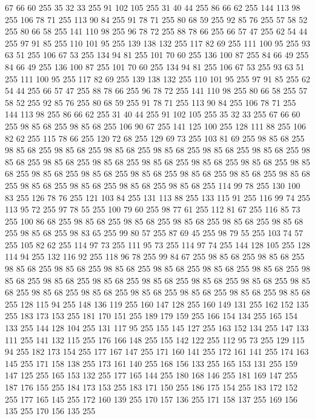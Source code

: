 67 66 60 255 35 32 33 255 91 102 105 255 31 40 44 255 86 66 62 255 144 113 98 255 106 78 71 255 113 90 84 255 91 78 71 255 80 68 59 255 92 85 76 255 57 58 52 255 80 66 58 255 141 110 98 255 96 78 72 255 88 78 66 255 66 57 47 255 62 54 44 255 97 91 85 255 110 101 95 255 139 138 132 255 117 82 69 255 111 100 95 255 93 63 51 255 106 67 53 255 134 94 81 255 101 70 60 255 136 100 87 255 84 66 49 255 84 66 49 255 136 100 87 255 101 70 60 255 134 94 81 255 106 67 53 255 93 63 51 255 111 100 95 255 117 82 69 255 139 138 132 255 110 101 95 255 97 91 85 255 62 54 44 255 66 57 47 255 88 78 66 255 96 78 72 255 141 110 98 255 80 66 58 255 57 58 52 255 92 85 76 255 80 68 59 255 91 78 71 255 113 90 84 255 106 78 71 255 144 113 98 255 86 66 62 255 31 40 44 255 91 102 105 255 35 32 33 255 67 66 60 255 98 85 68 255 98 85 68 255 106 90 67 255 141 125 100 255 128 111 88 255 106 82 62 255
115 78 66 255 120 72 68 255 129 69 73 255 103 81 69 255 98 85 68 255 98 85 68 255 98 85 68 255 98 85 68 255 98 85 68 255 98 85 68 255 98 85 68 255 98 85 68 255 98 85 68 255 98 85 68 255 98 85 68 255 98 85 68 255 98 85 68 255 98 85 68 255 98 85 68 255 98 85 68 255 98 85 68 255 98 85 68 255 98 85 68 255 98 85 68 255 98 85 68 255 98 85 68 255 98 85 68 255 98 85 68 255 114 99 78 255 130 100 83 255 126 78 76 255 121 103 84 255 131 113 88 255 133 115 91 255 116 99 74 255 113 95 72 255 97 78 55 255 100 79 60 255 98 77 61 255 112 81 67 255 116 85 73 255 100 86 68 255 98 85 68 255 98 85 68 255 98 85 68 255 98 85 68 255 98 85 68 255 98 85 68 255 98 83 65 255 99 80 57 255 87 69 45 255 98 79 55 255 103 74 57 255 105 82 62 255 114 97 73 255 111 95 73 255 114 97 74 255 144 128 105 255 128 114 94 255 132 116 92 255 118 96 78 255 99 84 67 255 98 85 68 255 98 85 68 255
98 85 68 255 98 85 68 255 98 85 68 255 98 85 68 255 98 85 68 255 98 85 68 255 98 85 68 255 98 85 68 255 98 85 68 255 98 85 68 255 98 85 68 255 98 85 68 255 98 85 68 255 98 85 68 255 98 85 68 255 98 85 68 255 98 85 68 255 98 85 68 255 98 85 68 255 128 115 94 255 148 136 119 255 160 147 128 255 160 149 131 255 162 152 135 255 183 173 153 255 181 170 151 255 189 179 159 255 166 154 134 255 165 154 133 255 144 128 104 255 131 117 95 255 155 145 127 255 163 152 134 255 147 133 111 255 141 132 115 255 176 166 148 255 155 142 122 255 112 95 73 255 129 115 94 255 182 173 154 255 177 167 147 255 171 160 141 255 172 161 141 255 174 163 145 255 171 158 138 255 173 161 140 255 168 156 133 255 165 153 131 255 159 147 125 255 165 153 132 255 177 165 144 255 180 168 146 255 181 169 147 255 187 176 155 255 184 173 153 255 183 171 150 255 186 175 154 255 183 172 152 255 177 165 145 255 172 160 139 255 170 157 136 255 171 158 137 255 169 156 135 255 170 156 135 255
